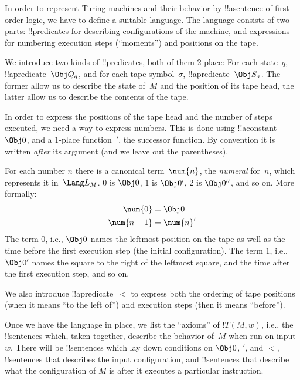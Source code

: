 \documentclass[../../../include/open-logic-section]{subfiles}
\begin{document}

\begin{explain}
In order to represent Turing machines and their behavior by !!a{sentence}
of first-order logic, we have to define a suitable language. The
language consists of two parts: !!{predicate}s for describing
configurations of the machine, and expressions for numbering execution
steps (``moments'') and positions on the tape.

We introduce two kinds of !!{predicate}s, both of them 2-place: For
each state~$q$, !!a{predicate}~$\Obj Q_q$, and for each tape
symbol~$\sigma$, !!a{predicate}~$\Obj S_\sigma$. The former allow us
to describe the state of~$M$ and the position of its tape head, the
latter allow us to describe the contents of the tape.  

In order to express the positions of the tape head and the number of
steps executed, we need a way to express numbers. This is done using
!!a{constant}~$\Obj 0$, and a $1$-place function~$\prime$, the
successor function. By convention it is written \emph{after} its
argument (and we leave out the parentheses).

For each number $n$ there is a canonical term~$\num{n}$, the
\emph{numeral} for~$n$, which represents it in~$\Lang L_M$. $\num{0}$
is $\Obj 0$, $\num{1}$ is $\Obj 0'$, $\num{2}$ is $\Obj 0''$, and so
on. More formally:
\begin{align*}
\num{0} & = \Obj 0 \\
\num{n+1} &= \num{n}'
\end{align*}
The term $\num{0}$, i.e., $\Obj 0$ names the leftmost position on the
tape as well as the time before the first execution step (the initial
configuration). The term $\num{1}$, i.e., $\Obj 0'$ names the square
to the right of the leftmost square, and the time after the first
execution step, and so on.

We also introduce !!a{predicate}~$<$ to express both the ordering of
tape positions (when it means ``to the left of'') and execution steps
(then it means ``before'').

Once we have the language in place, we list the ``axioms'' of $!T(M,
w)$, i.e., the !!{sentence}s which, taken together, describe the
behavior of~$M$ when run on input~$w$.  There will be !!{sentence}s
which lay down conditions on $\Obj 0$, $\prime$, and $<$,
!!{sentence}s that describes the input configuration, and
!!{sentence}s that describe what the configuration of $M$ is after it
executes a particular instruction.
\end{explain}
\end{document}
